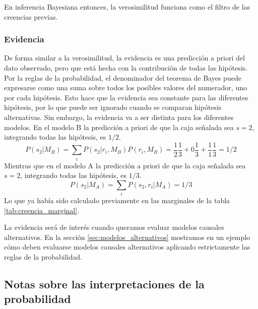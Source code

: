 \documentclass[a4paper,10pt]{book}
\theoremstyle{definition}
\begin{document}

En inferencia Bayesiana entonces, la verosimilitud funciona como el filtro de las creencias previas. 

\subsubsection*{Evidencia}

De forma similar a la verosimilitud, la evidencia es una predicción a priori del dato observado, pero que está hecha con la contribución de todas las hipótesis.
%
Por la reglas de la probabilidad, el denominador del teorema de Bayes puede expresarse como una suma sobre todos los posibles valores del numerador, uno por cada hipótesis.
%
Esto hace que la evidencia sea constante para las diferentes hipótesis, por lo que puede ser ignorado cuando se comparan hipótesis alternativas.
%
Sin embargo, la evidencia va a ser distinta para los diferentes modelos.
%
En el modelo B la predicción a priori de que la caja señalada sea $s=2$, integrando todas las hipótesis, es $1/2$. 
%
\begin{equation}
P(s_2|M_B) = \sum_i P(s_2|r_i, M_B) P(r_i, M_B) = \frac{1}{2} \frac{1}{3} + 0 \frac{1}{3} + \frac{1}{1} \frac{1}{3} = 1/2 
\end{equation}
%
Mientras que en el modelo A la predicción a priori de que la caja señalada sea $s=2$, integrando todas las hipótesis, es $1/3$. 
%
\begin{equation}
P(s_2|M_A) = \sum_i P(s_2,r_i| M_A) = 1/3 
\end{equation}
%
Lo que ya había sido calculado previamente en las marginales de la tabla \ref{tab:creencia_marginal}.


La evidencia será de interés cuando queramos evaluar modelos causales alternativos.
%
En la sección \ref{sec:modelos_alternativos} mostramos en un ejemplo cómo deben evaluarse modelos causales alternativos aplicando estrictamente las reglas de la probabilidad.


\subsection{Notas sobre las interpretaciones de la probabilidad}
% 
% 
\end{document}
